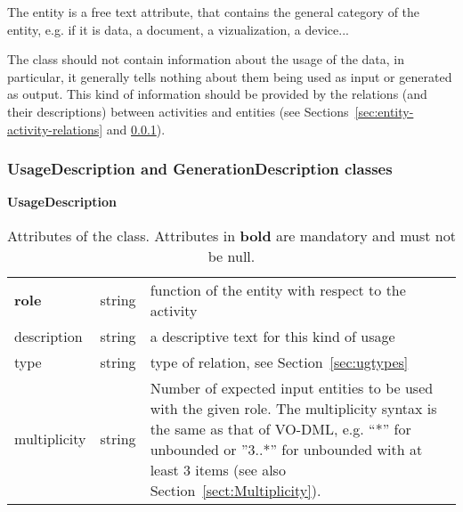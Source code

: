 The entity  is a free text attribute, that contains the general category of the entity, e.g. if it is data, a document, a vizualization, a device...

The  class should not contain information about the usage of the data, in particular, it generally tells nothing about them being used as input or generated as output. This kind of information should be provided by the relations (and their descriptions) between activities and entities (see Sections~\ref{sec:entity-activity-relations} and \ref{sec:use_gen_desc}).


\subsubsection{UsageDescription and GenerationDescription classes}
\label{sec:use_gen_desc}

\begin{table}[ht]
\small
{}\textwidth
\textbf{\normalsize UsageDescription}\vspace{0.25em}\\
\begin{tabulary}{1.0\textwidth}{llL}
\toprule
{} &   & \\
\midrule
\textbf{role} & string   & function of the entity with respect to the activity \\
description  & string & a descriptive text for this kind of usage \\
type    & string   & type of relation, see Section~\ref{sec:ugtypes} \\
multiplicity & string & Number of expected input entities to be used with the given role. The multiplicity syntax is the same as that of VO-DML, e.g. “*” for unbounded or ”3..*” for unbounded with at least 3 items (see also Section~\ref{sect:Multiplicity}). \\
\bottomrule
\end{tabulary}
\caption[Attributes of the  class]{Attributes of the  class. Attributes in \textbf{bold} are mandatory and must not be null.}
\label{tab:usagedescription}
\end{table}


